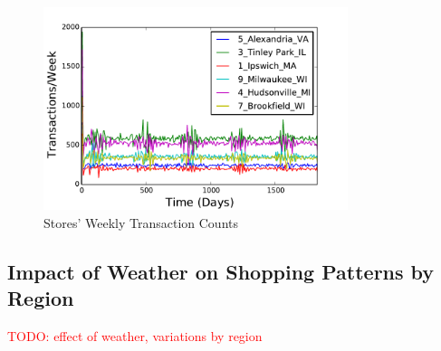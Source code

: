\documentclass[conference]{IEEEtran}
\begin{document}
\begin{figure}[!h]
  \centering
  \includegraphics[width=3.5in]{figures/weather_weekly_transaction_counts.pdf}
  \caption{Stores' Weekly Transaction Counts}
  \label{fig:weekly-trans-counts}
\end{figure}

\subsection{Impact of Weather on Shopping Patterns by Region}

\textcolor{red}{TODO: effect of weather, variations by region}


\end{document}
